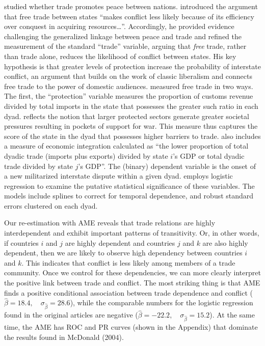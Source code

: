 \documentclass{article}[12pt]
\begin{document}
\citet{mcdonald:2004} studied whether trade promotes peace between
nations.  \citet[p. 547]{mcdonald:2004} introduced the argument that
free trade between states ``makes conflict less likely
because of its efficiency over conquest in acquiring
resources\ldots''. Accordingly, he provided evidence challenging the
generalized linkage between peace and trade and refined the
measurement of the standard ``trade'' variable, arguing that
\textit{free} trade, rather than trade alone, reduces the likelihood
of conflict between states. His key hypothesis is that greater levels
of protection increase the probability of interstate conflict, an
argument that builds on the work of classic liberalism and connects
free trade to the power of domestic audiences. \citet{mcdonald:2004}
measured free trade in two ways. The first, the ``protection''
variable measures the proportion of customs revenue divided by total
imports in the state that possesses the greater such ratio in each
dyad. reflects the notion that larger protected sectors generate
greater societal pressures resulting in pockets of support for war.
This measure thus captures the score of the state in the dyad that
possesses higher barriers to trade. \citet[p. 560]{mcdonald:2004} also
includes a measure of economic integration  calculated as ``the lower
proportion of total dyadic trade (imports plus exports) divided by
state $i$'s GDP or total dyadic trade divided by state $j$'s
GDP''. The (binary) dependent variable is the onset of a new
militarized interstate dispute within a given dyad.
 \citet{mcdonald:2004} employs logistic regression to examine the
 putative statistical significance of these variables. The models
 include splines to correct for temporal dependence, and robust
 standard errors clustered on each dyad.

Our re-estimation with AME reveals that trade relations are highly interdependent and exhibit important patterns of transitivity.  Or, in other words, if countries $i$ and $j$ are highly dependent and countries $j$ and $k$ are also highly dependent, then we are likely to observe high dependency between countries $i$ and $k$. This indicates that conflict is less likely among members of a trade community. Once we control for these dependencies, we can more clearly interpret the positive link between trade and conflict.  The most striking thing is that AME finds a positive conditional association between trade dependence and conflict ($\hat{\beta}= 18.4, \quad \sigma_{\hat{\beta}} = 28.6$), while the comparable numbers for the logistic regression found in the original articles are negative ($\hat{\beta}= -22.2, \quad \sigma_{\hat{\beta}} = 15.2$). At the same time, the AME has ROC and PR curves (shown in the Appendix) that dominate the results found in McDonald (2004).
\end{document}
